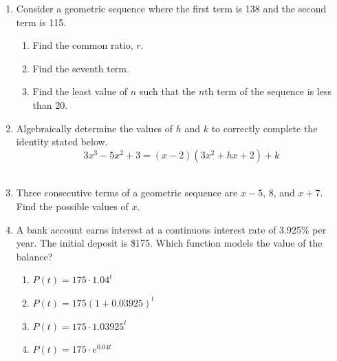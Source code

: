 \documentclass[12pt, oneside]{article}
\begin{document}
\begin{enumerate}
\item Consider a geometric sequence where the first term is 138 and the second term is 115.
\begin{enumerate}
    \item Find the common ratio, $r$.\\[20pt]
        \begin{flushright}[1]\end{flushright}
    \item Find the seventh term.\\[80pt]
        \begin{flushright}[2]\end{flushright}
    \item Find the least value of $n$ such that the $n$th term of the sequence is less than 20. \\[80pt]
        \begin{flushright}[3]\end{flushright}
\end{enumerate}

\newpage
\item Algebraically determine the values of $h$ and $k$ to correctly complete the identity stated below.
\[3x^3-5x^2+3=(x-2)(3x^2+hx+2)+k\] \\[2in] 
        \begin{flushright}[4]\end{flushright}

\item Three consecutive terms of a geometric sequence are $x-5$, 8, and $x+7$.\\
Find the possible values of $x$.\\[3in]
    \begin{flushright}[6]\end{flushright}

\newpage
\item A bank account earns interest at a continuous interest rate of 3.925\% per year. The initial deposit is \$175. Which function models the value of the balance? \qquad [2]
\begin{enumerate}
    \item $P(t)=175 \cdot 1.04^{t}$
    \item $P(t)=175 (1+0.03925)^{t}$
    \item $P(t)=175 \cdot 1.03925^{t}$
    \item $P(t)=175 \cdot e^{0.04t}$
\end{enumerate}



\end{enumerate}
\end{document}
